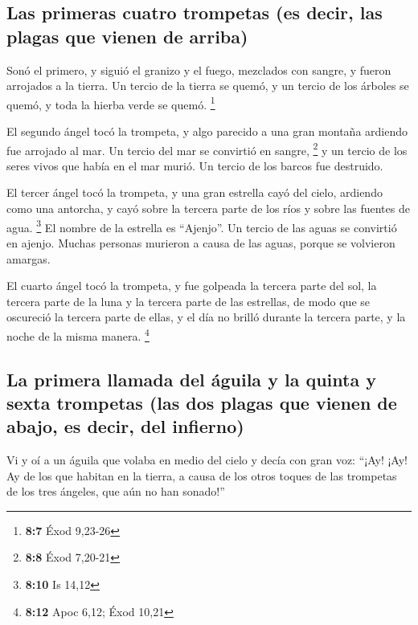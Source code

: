 \begin{paracol}{2}
\hypertarget{las-primeras-cuatro-trompetas-es-decir-las-plagas-que-vienen-de-arriba}{%
\subsection{Las primeras cuatro trompetas (es decir, las plagas que
vienen de
arriba)}\label{las-primeras-cuatro-trompetas-es-decir-las-plagas-que-vienen-de-arriba}}

 Sonó el primero, y siguió el granizo y el fuego,
mezclados con sangre, y fueron arrojados a la tierra. Un tercio de la
tierra se quemó, y un tercio de los árboles se quemó, y toda la hierba
verde se quemó. \footnote{\textbf{8:7} Éxod 9,23-26}

 El segundo ángel tocó la trompeta, y algo parecido a una
gran montaña ardiendo fue arrojado al mar. Un tercio del mar se
convirtió en sangre, \footnote{\textbf{8:8} Éxod 7,20-21} 
y un tercio de los seres vivos que había en el mar murió. Un tercio de
los barcos fue destruido.

 El tercer ángel tocó la trompeta, y una gran estrella
cayó del cielo, ardiendo como una antorcha, y cayó sobre la tercera
parte de los ríos y sobre las fuentes de agua. \footnote{\textbf{8:10}
  Is 14,12}  El nombre de la estrella es ``Ajenjo''. Un
tercio de las aguas se convirtió en ajenjo. Muchas personas murieron a
causa de las aguas, porque se volvieron amargas.

 El cuarto ángel tocó la trompeta, y fue golpeada la
tercera parte del sol, la tercera parte de la luna y la tercera parte de
las estrellas, de modo que se oscureció la tercera parte de ellas, y el
día no brilló durante la tercera parte, y la noche de la misma manera.
\footnote{\textbf{8:12} Apoc 6,12; Éxod 10,21}

\hypertarget{la-primera-llamada-del-uxe1guila-y-la-quinta-y-sexta-trompetas-las-dos-plagas-que-vienen-de-abajo-es-decir-del-infierno}{%
\subsection{La primera llamada del águila y la quinta y sexta trompetas
(las dos plagas que vienen de abajo, es decir, del
infierno)}\label{la-primera-llamada-del-uxe1guila-y-la-quinta-y-sexta-trompetas-las-dos-plagas-que-vienen-de-abajo-es-decir-del-infierno}}

 Vi y oí a un águila que volaba en medio del cielo y
decía con gran voz: ``¡Ay! ¡Ay! Ay de los que habitan en la tierra, a
causa de los otros toques de las trompetas de los tres ángeles, que aún
no han sonado!''


\end{paracol}
